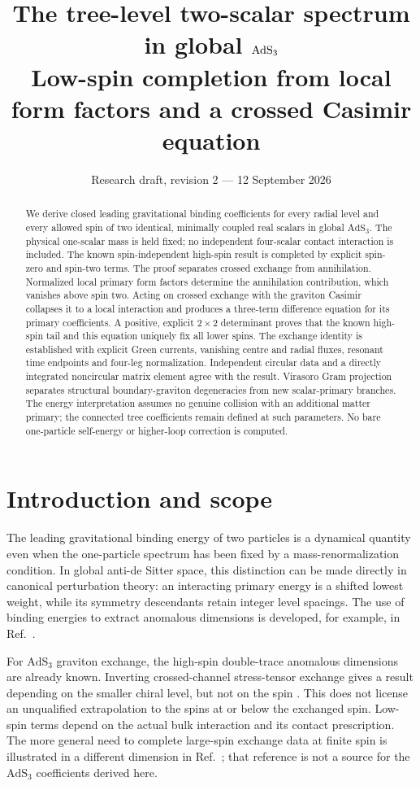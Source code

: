 \documentclass[11pt,a4paper]{article}
\title{The tree-level two-scalar spectrum in global $\AdS_3$\\[5pt]
\large Low-spin completion from local form factors and a crossed Casimir equation}
\author{}
\date{Research draft, revision 2 --- 12 September 2026}
\numberwithin{equation}{section}
\theoremstyle{remark}\newtheorem{remark}[theorem]{Remark}
\newcommand{\AdS}{\mathrm{AdS}}
\begin{document}
\maketitle
\vspace{-15pt}
\begin{abstract}
We derive closed leading gravitational binding coefficients for every radial level and every allowed spin of two identical, minimally coupled real scalars in global $\AdS_3$. The physical one-scalar mass is held fixed; no independent four-scalar contact interaction is included. The known spin-independent high-spin result is completed by explicit spin-zero and spin-two terms. The proof separates crossed exchange from annihilation. Normalized local primary form factors determine the annihilation contribution, which vanishes above spin two. Acting on crossed exchange with the graviton Casimir collapses it to a local interaction and produces a three-term difference equation for its primary coefficients. A positive, explicit $2\times2$ determinant proves that the known high-spin tail and this equation uniquely fix all lower spins. The exchange identity is established with explicit Green currents, vanishing centre and radial fluxes, resonant time endpoints and four-leg normalization. Independent circular data and a directly integrated noncircular matrix element agree with the result. Virasoro Gram projection separates structural boundary-graviton degeneracies from new scalar-primary branches. The energy interpretation assumes no genuine collision with an additional matter primary; the connected tree coefficients remain defined at such parameters. No bare one-particle self-energy or higher-loop correction is computed.
\end{abstract}

\section{Introduction and scope}

The leading gravitational binding energy of two particles is a dynamical quantity even when the one-particle spectrum has been fixed by a mass-renormalization condition. In global anti-de Sitter space, this distinction can be made directly in canonical perturbation theory: an interacting primary energy is a shifted lowest weight, while its symmetry descendants retain integer level spacings. The use of binding energies to extract anomalous dimensions is developed, for example, in Ref.~\cite{FS}.

For $\AdS_3$ graviton exchange, the high-spin double-trace anomalous dimensions are already known. Inverting crossed-channel stress-tensor exchange gives a result depending on the smaller chiral level, but not on the spin \cite{KSS,CH}. This does not license an unqualified extrapolation to the spins at or below the exchanged spin. Low-spin terms depend on the actual bulk interaction and its contact prescription. The more general need to complete large-spin exchange data at finite spin is illustrated in a different dimension in Ref.~\cite{ABP}; that reference is not a source for the $\AdS_3$ coefficients derived here.
\end{document}

